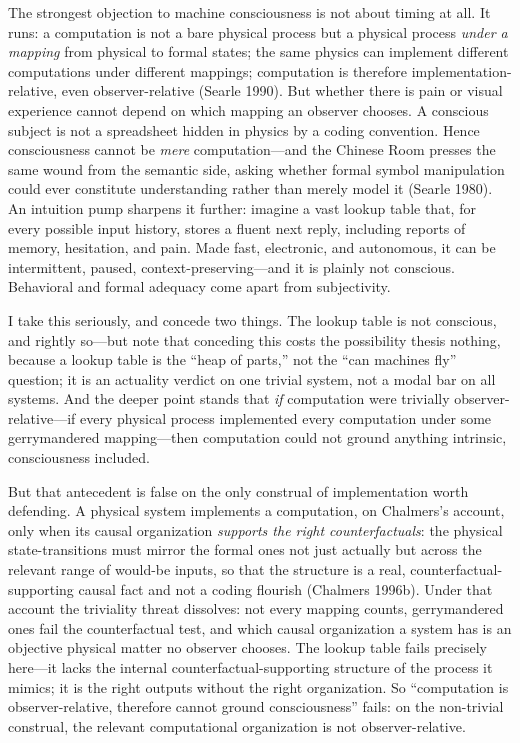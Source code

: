 \documentclass[11pt]{article}
\begin{document}
The strongest objection to machine consciousness is not about timing at all. It runs: a computation is not a bare physical process but a physical process \emph{under a mapping} from physical to formal states; the same physics can implement different computations under different mappings; computation is therefore implementation-relative, even observer-relative (Searle 1990). But whether there is pain or visual experience cannot depend on which mapping an observer chooses. A conscious subject is not a spreadsheet hidden in physics by a coding convention. Hence consciousness cannot be \emph{mere} computation---and the Chinese Room presses the same wound from the semantic side, asking whether formal symbol manipulation could ever constitute understanding rather than merely model it (Searle 1980). An intuition pump sharpens it further: imagine a vast lookup table that, for every possible input history, stores a fluent next reply, including reports of memory, hesitation, and pain. Made fast, electronic, and autonomous, it can be intermittent, paused, context-preserving---and it is plainly not conscious. Behavioral and formal adequacy come apart from subjectivity.

I take this seriously, and concede two things. The lookup table is not conscious, and rightly so---but note that conceding this costs the possibility thesis nothing, because a lookup table is the ``heap of parts,'' not the ``can machines fly'' question; it is an actuality verdict on one trivial system, not a modal bar on all systems. And the deeper point stands that \emph{if} computation were trivially observer-relative---if every physical process implemented every computation under some gerrymandered mapping---then computation could not ground anything intrinsic, consciousness included.

But that antecedent is false on the only construal of implementation worth defending. A physical system implements a computation, on Chalmers's account, only when its causal organization \emph{supports the right counterfactuals}: the physical state-transitions must mirror the formal ones not just actually but across the relevant range of would-be inputs, so that the structure is a real, counterfactual-supporting causal fact and not a coding flourish (Chalmers 1996b). Under that account the triviality threat dissolves: not every mapping counts, gerrymandered ones fail the counterfactual test, and which causal organization a system has is an objective physical matter no observer chooses. The lookup table fails precisely here---it lacks the internal counterfactual-supporting structure of the process it mimics; it is the right outputs without the right organization. So ``computation is observer-relative, therefore cannot ground consciousness'' fails: on the non-trivial construal, the relevant computational organization is not observer-relative.
\end{document}
